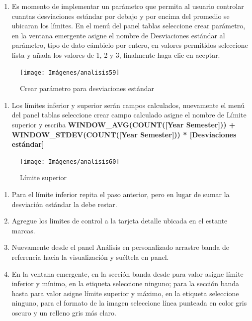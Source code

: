 \documentclass[
]{book}
\providecommand{\tightlist}{%
  \setlength{\itemsep}{0pt}\setlength{\parskip}{0pt}}
\begin{document}
\begin{enumerate}
\def\labelenumi{\arabic{enumi}.}
\setcounter{enumi}{9}
\tightlist
\item
  Es momento de implementar un parámetro que permita al usuario controlar cuantas desviaciones estándar por debajo y por encima del promedio se ubicaran los límites. En el menú del panel tablas seleccione crear parámetro, en la ventana emergente asigne el nombre de Desviaciones estándar al parámetro, tipo de dato cámbielo por entero, en valores permitidos seleccione lista y añada los valores de 1, 2 y 3, finalmente haga clic en aceptar.
\end{enumerate}

\begin{figure}

{\centering \texttt{[image: Imágenes/analisis59]} 

}

\caption{Crear parámetro para desviaciones estándar}\label{fig:paso10graficodecontrol-fig}
\end{figure}

\begin{enumerate}
\def\labelenumi{\arabic{enumi}.}
\setcounter{enumi}{10}
\tightlist
\item
  Los límites inferior y superior serán campos calculados, nuevamente el menú del panel tablas seleccione crear campo calculado asigne el nombre de Límite superior y escriba \textbf{WINDOW\_AVG(COUNT({[}Year Semester{]})) + WINDOW\_STDEV(COUNT({[}Year Semester{]})) * {[}Desviaciones estándar{]}}
\end{enumerate}

\begin{figure}

{\centering \texttt{[image: Imágenes/analisis60]} 

}

\caption{Límite superior}\label{fig:paso11graficodecontrol-fig}
\end{figure}

\begin{enumerate}
\def\labelenumi{\arabic{enumi}.}
\setcounter{enumi}{11}
\item
  Para el límite inferior repita el paso anterior, pero en lugar de sumar la desviación estándar la debe restar.
\item
  Agregue los limites de control a la tarjeta detalle ubicada en el estante marcas.
\item
  Nuevamente desde el panel Análisis en personalizado arrastre banda de referencia hacia la visualización y suéltela en panel.
\item
  En la ventana emergente, en la sección banda desde para valor asigne límite inferior y mínimo, en la etiqueta seleccione ninguno; para la sección banda hasta para valor asigne límite superior y máximo, en la etiqueta seleccione ninguno, para el formato de la imagen seleccione línea punteada en color gris oscuro y un relleno gris más claro.
\end{enumerate}
\end{document}
